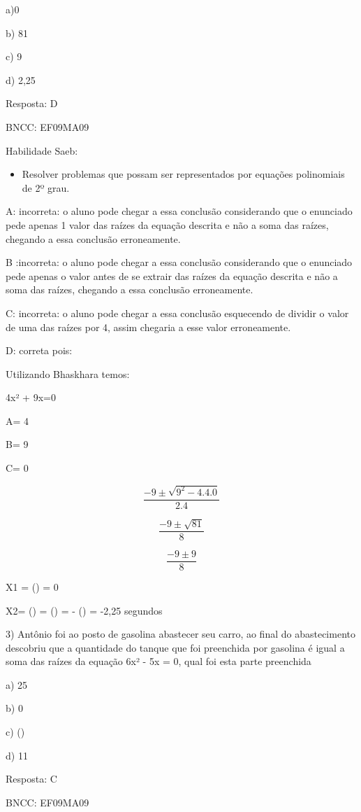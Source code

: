 a)0

b) 81

c) 9

d) 2,25

Resposta: D

BNCC: EF09MA09

Habilidade Saeb:

\begin{itemize}
\tightlist
\item
  Resolver problemas que possam ser representados por equações
  polinomiais de 2º grau.
\end{itemize}

A: incorreta: o aluno pode chegar a essa conclusão considerando que o
enunciado pede apenas 1 valor das raízes da equação descrita e não a
soma das raízes, chegando a essa conclusão erroneamente.

B :incorreta: o aluno pode chegar a essa conclusão considerando que o
enunciado pede apenas o valor antes de se extrair das raízes da equação
descrita e não a soma das raízes, chegando a essa conclusão
erroneamente.

C: incorreta: o aluno pode chegar a essa conclusão esquecendo de dividir
o valor de uma das raízes por 4, assim chegaria a esse valor
erroneamente.

D: correta pois:

Utilizando Bhaskhara temos:

4x² + 9x=0

A= 4

B= 9

C= 0

\[\frac{- 9 \pm \sqrt{9^{2} - 4.4.0}}{2.4}\]

\[\frac{- 9 \pm \sqrt{81}}{8}\]

\[\frac{- 9 \pm 9}{8}\]

X1 = () = 0

X2= () = () = - () =
-2,25 segundos

3) Antônio foi ao posto de gasolina abastecer seu carro, ao final do
abastecimento descobriu que a quantidade do tanque que foi preenchida
por gasolina é igual a soma das raízes da equação 6x² - 5x = 0, qual foi
esta parte preenchida

a) 25

b) 0

c) ()

d) 11

Resposta: C

BNCC: EF09MA09

